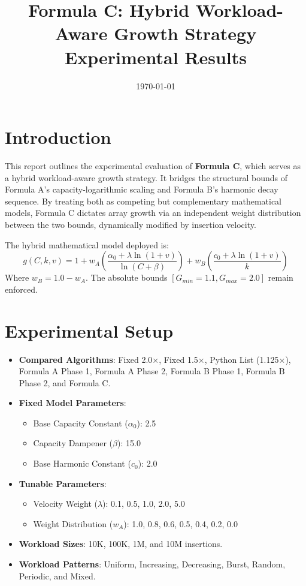 \documentclass[11pt, a4paper]{article}
\title{Formula C: Hybrid Workload-Aware Growth Strategy \\ Experimental Results}
\author{}
\date{\today}
\begin{document}
\maketitle
\tableofcontents
\listoffigures
\listoftables
\newpage

\section{Introduction}
This report outlines the experimental evaluation of \textbf{Formula C}, which serves as a hybrid workload-aware growth strategy. It bridges the structural bounds of Formula A's capacity-logarithmic scaling and Formula B's harmonic decay sequence. By treating both as competing but complementary mathematical models, Formula C dictates array growth via an independent weight distribution between the two bounds, dynamically modified by insertion velocity.

The hybrid mathematical model deployed is:
$$ g(C,k,v) = 1 + w_A \left( \frac{\alpha_0 + \lambda \ln(1+v)}{\ln(C+\beta)} \right) + w_B \left( \frac{c_0 + \lambda \ln(1+v)}{k} \right) $$
Where $w_B = 1.0 - w_A$. The absolute bounds $[G_{min}=1.1, G_{max}=2.0]$ remain enforced.

\section{Experimental Setup}
\begin{itemize}
    \item \textbf{Compared Algorithms}: Fixed 2.0$\times$, Fixed 1.5$\times$, Python List (1.125$\times$), Formula A Phase 1, Formula A Phase 2, Formula B Phase 1, Formula B Phase 2, and Formula C.
    \item \textbf{Fixed Model Parameters}: 
        \begin{itemize}
            \item Base Capacity Constant ($\alpha_0$): 2.5
            \item Capacity Dampener ($\beta$): 15.0
            \item Base Harmonic Constant ($c_0$): 2.0
        \end{itemize}
    \item \textbf{Tunable Parameters}: 
        \begin{itemize}
            \item Velocity Weight ($\lambda$): 0.1, 0.5, 1.0, 2.0, 5.0
            \item Weight Distribution ($w_A$): 1.0, 0.8, 0.6, 0.5, 0.4, 0.2, 0.0
        \end{itemize}
    \item \textbf{Workload Sizes}: 10K, 100K, 1M, and 10M insertions.
    \item \textbf{Workload Patterns}: Uniform, Increasing, Decreasing, Burst, Random, Periodic, and Mixed.
\end{itemize}
\end{document}
